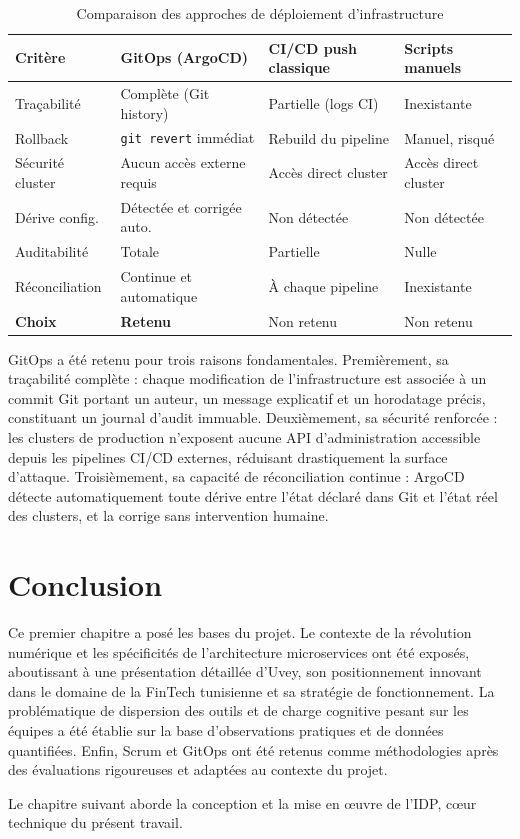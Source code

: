 \begin{table}[H]
  \centering
  \renewcommand{\arraystretch}{1.3}
  \begin{tabularx}{\textwidth}{L{3.5cm} L{3.5cm} L{3.5cm} L{3cm}}
    \toprule
    \textbf{Critère} & \textbf{GitOps (ArgoCD)} & \textbf{CI/CD push classique} & \textbf{Scripts manuels} \\
    \midrule
    Traçabilité       & Complète (Git history) & Partielle (logs CI) & Inexistante \\
    Rollback          & \texttt{git revert} immédiat & Rebuild du pipeline & Manuel, risqué \\
    Sécurité cluster  & Aucun accès externe requis & Accès direct cluster & Accès direct cluster \\
    Dérive config.    & Détectée et corrigée auto. & Non détectée & Non détectée \\
    Auditabilité      & Totale & Partielle & Nulle \\
    Réconciliation    & Continue et automatique & À chaque pipeline & Inexistante \\
    \textbf{Choix}    & \textbf{Retenu} & Non retenu & Non retenu \\
    \bottomrule
  \end{tabularx}
  \caption{Comparaison des approches de déploiement d'infrastructure}
  \label{tab:gitops_comparaison}
\end{table}

GitOps a été retenu pour trois raisons fondamentales. Premièrement, sa traçabilité complète : chaque modification de l'infrastructure est associée à un commit Git portant un auteur, un message explicatif et un horodatage précis, constituant un journal d'audit immuable. Deuxièmement, sa sécurité renforcée : les clusters de production n'exposent aucune API d'administration accessible depuis les pipelines \ac{CI/CD} externes, réduisant drastiquement la surface d'attaque. Troisièmement, sa capacité de réconciliation continue : ArgoCD détecte automatiquement toute dérive entre l'état déclaré dans Git et l'état réel des clusters, et la corrige sans intervention humaine.

\section*{Conclusion}

Ce premier chapitre a posé les bases du projet. Le contexte de la révolution numérique et les spécificités de l'architecture microservices ont été exposés, aboutissant à une présentation détaillée d'Uvey, son positionnement innovant dans le domaine de la FinTech tunisienne et sa stratégie de fonctionnement. La problématique de dispersion des outils et de charge cognitive pesant sur les équipes a été établie sur la base d'observations pratiques et de données quantifiées. Enfin, Scrum et GitOps ont été retenus comme méthodologies après des évaluations rigoureuses et adaptées au contexte du projet.

Le chapitre suivant aborde la conception et la mise en œuvre de l'\ac{IDP}, cœur technique du présent travail.
